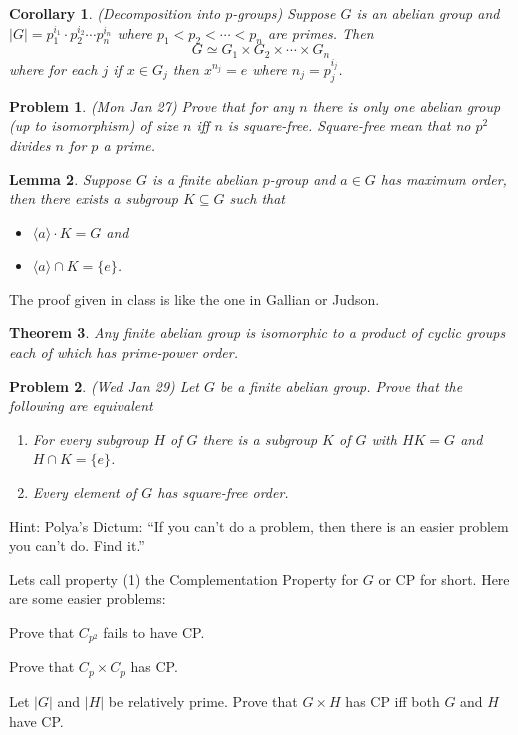\documentclass[12pt]{article}
\def\la{\lambda}
\def\isom{\simeq}
\def\su{\subseteq}
\newtheorem{theorem}{Theorem}
\newtheorem{lemma}[theorem]{Lemma}
\newtheorem{cor}[theorem]{Corollary}
\newtheorem{prob}{Problem}
\newenvironment{enum}
{\begin{list}{(\alph{enumi})}
{\usecounter{enumi}\setlength{\rightmargin}{\leftmargin}}}
{\end{list}}
\begin{document}
\begin{cor} (Decomposition into $p$-groups)
Suppose $G$ is an abelian group and $|G|=p_1^{i_1}\cdot p_2^{i_2}\cdots p_n^{i_n}$
where $p_1<p_2<\cdots <p_n$ are primes.  Then
$$G\isom G_1\times G_2\times\cdots\times G_n$$ 
where for each $j$ if $x\in G_j$ then $x^{n_j}=e$ where $n_j=p_j^{i_j}$.
\end{cor}

\begin{prob}
(Mon Jan 27) Prove that for any $n$ there is only one abelian group (up to 
isomorphism) of size $n$ iff $n$ is square-free.  Square-free
mean that no $p^2$ divides $n$ for $p$ a prime.
\end{prob}

\def\ra{\rangle}
\def\la{\langle}

\begin{lemma}
Suppose $G$ is a finite abelian $p$-group and $a\in G$ has maximum
order, then there exists a subgroup $K\su G$ such that
\begin{itemize}
\item $\la a\ra\cdot K=G$ and 
\item $\la a\ra\cap K=\{e\}$.
\end{itemize}
\end{lemma}

The proof given in class is like the one in Gallian or Judson.

\begin{theorem}
Any finite abelian group is isomorphic to a product of cyclic
groups each of which has prime-power order.
\end{theorem}

\begin{prob}(Wed Jan 29)
Let $G$ be a finite abelian group.  Prove that the following are equivalent
\begin{enumerate}
\item For every subgroup $H$ of $G$ there is a subgroup $K$ of $G$ with
$HK=G$ and $H\cap K=\{e\}$. 
\item Every  element of $G$ has square-free order.
\end{enumerate}
\end{prob}

Hint: Polya's Dictum: ``If you can't do a problem, then there is an
easier problem you can't do.  Find it.''

Lets call property (1) the Complementation Property for $G$
or CP for short.  Here are some easier problems:
\begin{enum}
\item Prove that $C_{p^2}$ fails to have CP.
\item Prove that $C_p\times C_p$ has CP.
\item Let $|G|$ and $|H|$ be
relatively prime.  Prove that $G\times H$ has CP iff both
$G$ and $H$ have CP.
\end{enum}
\end{document}
